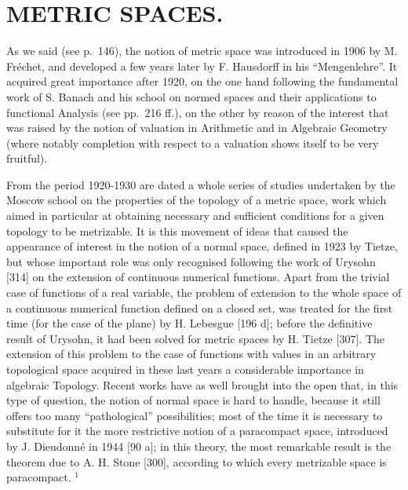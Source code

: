 \chapter{METRIC SPACES.}

As we said (see p.~146), the notion of metric space was introduced in 1906 by M. Fréchet, and developed a few years later by F. Hausdorff in his ``Mengenlehre''. It acquired great importance after 1920, on the one hand following the fundamental work of S. Banach and his school on normed spaces and their applications to functional Analysis (see pp.~216 ff.), on the other by reason of the interest that was raised by the notion of valuation in Arithmetic and in Algebraic Geometry (where notably completion with respect to a valuation shows itself to be very fruitful).

From the period 1920-1930 are dated a whole series of studies undertaken by the Moscow school on the properties of the topology of a metric space, work which aimed in particular at obtaining necessary and sufficient conditions for a given topology to be metrizable. It is this movement of ideas that caused the appearance of interest in the notion of a normal space, defined in 1923 by Tietze, but whose important role was only recognised following the work of Urysohn {[}314{]} on the extension of continuous numerical functions. Apart from the trivial case of functions of a real variable, the problem of extension to the whole space of a continuous numerical function defined on a closed set, was treated for the first time (for the case of the plane) by H. Lebesgue {[}196 d{]}; before the definitive result of Urysohn, it had been solved for metric spaces by H. Tietze {[}307{]}. The extension of this problem to the case of functions with values in an arbitrary topological space acquired in these last years a considerable importance in algebraic Topology. Recent works have as well brought into the open that, in this type of question, the notion of normal space is hard to handle, because it still offers too many ``pathological'' possibilities; most of the time it is necessary to substitute for it the more restrictive notion of a paracompact space, introduced by J. Dieudonné in 1944 {[}90 a{]}; in this theory, the most remarkable result is the theorem due to A. H. Stone {[}300{]}, according to which every metrizable space is paracompact. \(^{1}\)

